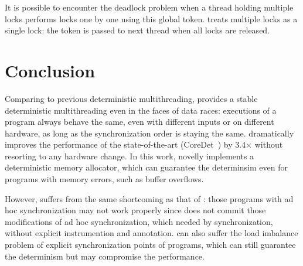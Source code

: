 It is possible to encounter the deadlock problem when a thread holding multiple locks 
performs locks one by one using this global token. 
\dthreads{} treats multiple locks as a single lock: the token is passed to next thread when all locks
are released. 

\section{Conclusion}

Comparing to previous deterministic multithreading, 
\Dthreads{} provides a stable deterministic multithreading even in
the faces of data races: executions of a program always behave the same, even with different inputs or 
on different hardware, as long as the synchronization order is staying the same. \Dthreads{} 
dramatically improves the performance of the state-of-the-art (CoreDet~\cite{coredet}) by
3.4$\times$ without resorting to any hardware change.
In this work, \dthreads{} novelly implements a deterministic memory allocator, which can
guarantee the determinsim even for programs with memory errors, such as buffer overflows.  

However, \dthreads{} suffers from the same shortcoming as that of \sheriff{}: those programs
with ad hoc synchronization may not work properly since \dthreads{} does not commit 
those modifications of ad hoc synchronization, which needed by synchronization, 
without explicit instrumention and annotation.
\dthreads{} can also suffer the load imbalance problem of explicit synchronization 
points of programs, 
which can still guarantee the determinism but may compromise the performance.

